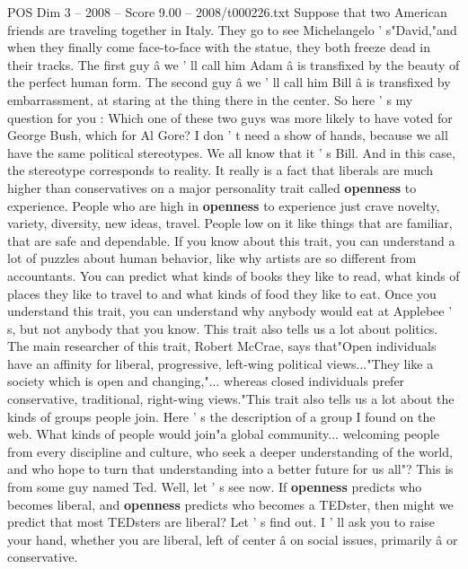\begin{textsample}{POS Dim 3 – 2008 – Score 9.00 – 2008/t000226.txt}  \label{ex:f3_pos_063}
Suppose that two American friends are traveling together in Italy.
They go to see Michelangelo ' s"David,"and when they finally come face-to-face with the statue, they both freeze dead in their tracks.
The first guy â we ' ll call him Adam â is transfixed by the beauty of the perfect human form.
The second guy â we ' ll call him Bill â is transfixed by embarrassment, at staring at the thing there in the center.
So here ' s my question for you : Which one of these two guys was more likely to have voted for George Bush, which for Al Gore?
I don ' t need a show of hands, because we all have the same political stereotypes.
We all know that it ' s Bill.
And in this case, the stereotype corresponds to reality.
It really is a fact that liberals are much higher than conservatives on a major personality trait called \textbf{openness} to experience.
People who are high in \textbf{openness} to experience just crave novelty, variety, diversity, new ideas, travel.
People low on it like things that are familiar, that are safe and dependable.
If you know about this trait, you can understand a lot of puzzles about human behavior, like why artists are so different from accountants.
You can predict what kinds of books they like to read, what kinds of places they like to travel to and what kinds of food they like to eat.
Once you understand this trait, you can understand why anybody would eat at Applebee ' s, but not anybody that you know.
This trait also tells us a lot about politics.
The main researcher of this trait, Robert McCrae, says that"Open individuals have an affinity for liberal, progressive, left-wing political views..."They like a society which is open and changing,"... whereas closed individuals prefer conservative, traditional, right-wing views."This trait also tells us a lot about the kinds of groups people join.
Here ' s the description of a group I found on the web.
What kinds of people would join"a global community... welcoming people from every discipline and culture, who seek a deeper understanding of the world, and who hope to turn that understanding into a better future for us all"?
This is from some guy named Ted.
Well, let ' s see now.
If \textbf{openness} predicts who becomes liberal, and \textbf{openness} predicts who becomes a TEDster, then might we predict that most TEDsters are liberal?
Let ' s find out.
I ' ll ask you to raise your hand, whether you are liberal, left of center â on social issues, primarily â or conservative.

\end{textsample}
